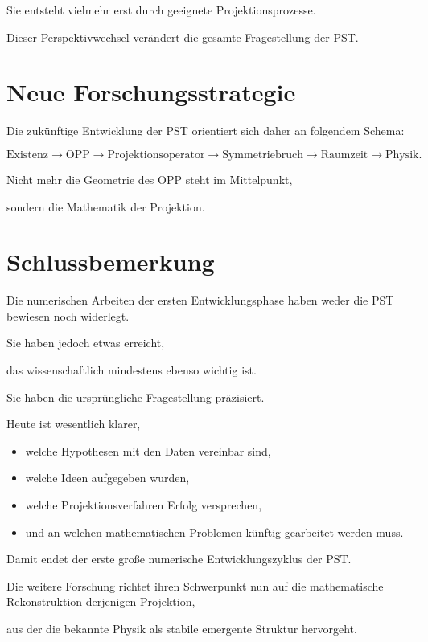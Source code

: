 Sie entsteht vielmehr erst durch geeignete Projektionsprozesse.

Dieser Perspektivwechsel verändert die gesamte Fragestellung der PST.


\section*{Neue Forschungsstrategie}

Die zukünftige Entwicklung der PST orientiert sich daher an folgendem Schema:

\[
\boxed{
\text{Existenz}
\rightarrow
\text{OPP}
\rightarrow
\text{Projektionsoperator}
\rightarrow
\text{Symmetriebruch}
\rightarrow
\text{Raumzeit}
\rightarrow
\text{Physik}.
}
\]

Nicht mehr die Geometrie des OPP steht im Mittelpunkt,

sondern die Mathematik der Projektion.


\section*{Schlussbemerkung}

Die numerischen Arbeiten der ersten Entwicklungsphase haben weder die PST bewiesen noch widerlegt.

Sie haben jedoch etwas erreicht,

das wissenschaftlich mindestens ebenso wichtig ist.

Sie haben die ursprüngliche Fragestellung präzisiert.

Heute ist wesentlich klarer,

\begin{itemize}

\item

welche Hypothesen mit den Daten vereinbar sind,

\item

welche Ideen aufgegeben wurden,

\item

welche Projektionsverfahren Erfolg versprechen,

\item

und an welchen mathematischen Problemen künftig gearbeitet werden muss.

\end{itemize}

Damit endet der erste große numerische Entwicklungszyklus der PST.

Die weitere Forschung richtet ihren Schwerpunkt nun auf die mathematische Rekonstruktion derjenigen Projektion,

aus der die bekannte Physik als stabile emergente Struktur hervorgeht.
